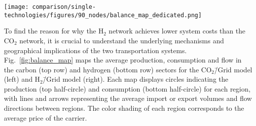\documentclass[twocolumn]{article}
\newcommand{\COtwo}{CO$_2$}
\newcommand{\Htwo}{H$_2$}
\newcommand{\modCO}{CO$_2$\=/Grid model}
\newcommand{\modH}{H$_2$\=/Grid model}
\newcommand{\carbon}{CO$_2$}
\newcommand{\hydrogen}{H$_2$}
\newcommand{\carbonmodel}{CO$_2$\=/Grid model}
\newcommand{\hydrogenmodel}{H$_2$\=/Grid model}
\begin{document}
\begin{figure*}[ht!]
    \centering
    \texttt{[image: comparison/single-technologies/figures/90\_nodes/balance\_map\_dedicated.png]}
    \caption{Optimal operation, flows and prices of the carbon (top line) and hydrogen (bottom line) sectors for the \carbonmodel{} (left) and the \hydrogenmodel{} (right) in the net zero scenario. For each region, upper semicircles show the average production per technology, lower semicircles the consumption, and colors the average marginal prices. Lines and arrows show the interregional transportation. Carbon sequestration offshore are drawn as full circles. \carbon{} and \hydrogen{} transport goes from low price to high price areas to supply CU and, in the case of \carbonmodel{}, CS.
    }
    \label{fig:balance_map}
\end{figure*}

To find the reason for why the \Htwo{} network achieves lower system costs than the \COtwo{} network, it is crucial to understand the underlying mechanisms and geographical implications of the two transportation systems. Fig.~\ref{fig:balance_map} maps the average production, consumption and flow in the carbon (top row) and hydrogen (bottom row) sectors for the \modCO{} (left) and \modH{} (right). Each map displays circles indicating the production (top half-circle) and consumption (bottom half-circle) for each region, with lines and arrows representing the average import or export volumes and flow directions between regions. The color shading of each region corresponds to the average price of the carrier.
\end{document}
